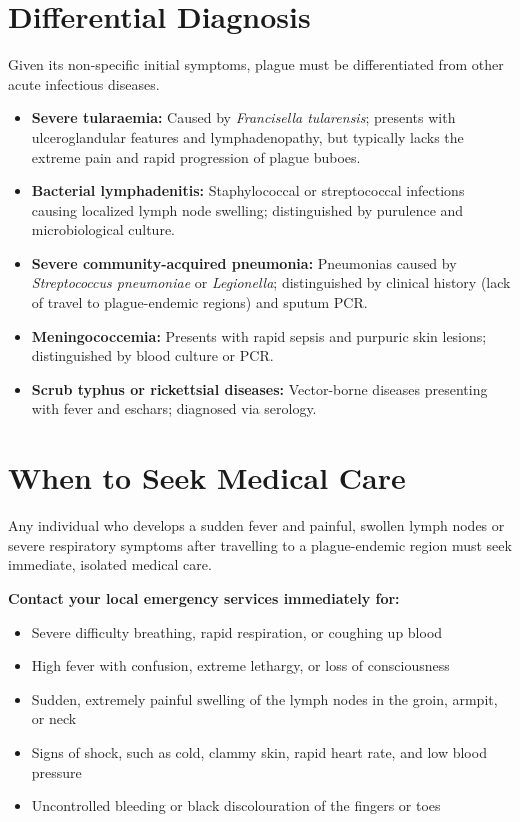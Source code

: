 \section*{Differential Diagnosis}
Given its non-specific initial symptoms, plague must be differentiated from other acute infectious diseases.
\begin{itemize}
    \item \textbf{Severe tularaemia:} Caused by \textit{Francisella tularensis}; presents with ulceroglandular features and lymphadenopathy, but typically lacks the extreme pain and rapid progression of plague buboes.
    \item \textbf{Bacterial lymphadenitis:} Staphylococcal or streptococcal infections causing localized lymph node swelling; distinguished by purulence and microbiological culture.
    \item \textbf{Severe community-acquired pneumonia:} Pneumonias caused by \textit{Streptococcus pneumoniae} or \textit{Legionella}; distinguished by clinical history (lack of travel to plague-endemic regions) and sputum PCR.
    \item \textbf{Meningococcemia:} Presents with rapid sepsis and purpuric skin lesions; distinguished by blood culture or PCR.
    \item \textbf{Scrub typhus or rickettsial diseases:} Vector-borne diseases presenting with fever and eschars; diagnosed via serology.
\end{itemize}

\section*{When to Seek Medical Care}
Any individual who develops a sudden fever and painful, swollen lymph nodes or severe respiratory symptoms after travelling to a plague-endemic region must seek immediate, isolated medical care.

\textbf{Contact your local emergency services immediately for:}
\begin{itemize}
    \item Severe difficulty breathing, rapid respiration, or coughing up blood
    \item High fever with confusion, extreme lethargy, or loss of consciousness
    \item Sudden, extremely painful swelling of the lymph nodes in the groin, armpit, or neck
    \item Signs of shock, such as cold, clammy skin, rapid heart rate, and low blood pressure
    \item Uncontrolled bleeding or black discolouration of the fingers or toes
\end{itemize}

